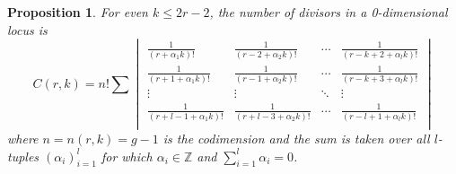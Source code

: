 \documentclass[11pt,reqno]{amsart}
\newcommand*{\Z}{\mathbb{Z}}
\theoremstyle{definition}
\theoremstyle{problem}
\theoremstyle{plain}
\newtheorem{proposition}[definition]{Proposition}
\theoremstyle{remark}
\theoremstyle{theorem}
\numberwithin{equation}{section}
\numberwithin{figure}{section}
\theoremstyle{definition}
\theoremstyle{problem}
\theoremstyle{plain}
\begin{document}
\begin{proposition}\label{prop:card}
  For even $k\leq2r-2$, the number of divisors in a 0-dimensional locus is
    \begin{equation} \label{eq:3}
    C(r,k) = n!\sum
    \begin{vmatrix}
      \frac{1}{(r+\alpha_1 k)!} & \frac{1}{(r-2+\alpha_2 k)!} & \cdots
      & \frac{1}{(r-k+2+\alpha_l k)!}\\
      \frac{1}{(r+1+\alpha_1 k)!} & \frac{1}{(r-1+\alpha_2 k)!} &
      \cdots
      & \frac{1}{(r-k+3+\alpha_l k)!}\\
      \vdots & \vdots & \ddots & \vdots\\
      \frac{1}{(r+l-1+\alpha_1 k)!} & \frac{1}{(r+l-3+\alpha_2 k)!}
      & \cdots & \frac{1}{(r-l+1+\alpha_l k)!}\\
    \end{vmatrix}
    \end{equation}
    where $n=n(r,k)=g-1$ is the codimension and the sum is taken over
    all $l$-tuples $(\alpha_i)_{i=1}^l$ for which $\alpha_i \in \Z$ and
    $\sum_{i=1}^l\alpha_i=0$.
\end{proposition}

\end{document}
